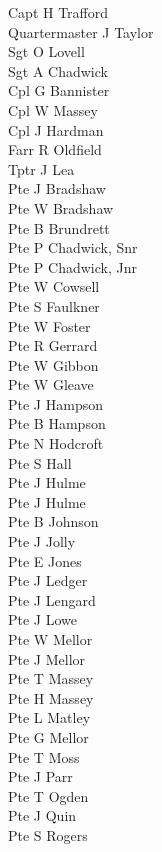 \begin{multicols}{2}
  \noindent
  Capt H Trafford \\
  Quartermaster J Taylor \\
  Sgt O Lovell \\
  Sgt A Chadwick \\
  Cpl G Bannister \\
  Cpl W Massey \\
  Cpl J Hardman \\
  Farr R Oldfield \\
  Tptr J Lea \\
  Pte J Bradshaw \\
  Pte W Bradshaw \\
  Pte B Brundrett \\
  Pte P Chadwick, Snr \\
  Pte P Chadwick, Jnr \\
  Pte W Cowsell \\
  Pte S Faulkner \\
  Pte W Foster \\
  Pte R Gerrard \\
  Pte W Gibbon \\
  Pte W Gleave \\
  Pte J Hampson \\
  Pte B Hampson \\
  Pte N Hodcroft \\
  Pte S Hall \\
  Pte J Hulme \\
  Pte J Hulme \\
  Pte B Johnson \\
  Pte J Jolly \\
  Pte E Jones \\
  Pte J Ledger \\
  Pte J Lengard \\
  Pte J Lowe \\
  Pte W Mellor \\
  Pte J Mellor \\
  Pte T Massey \\
  Pte H Massey \\
  Pte L Matley \\
  Pte G Mellor \\
  Pte T Moss \\
  Pte J Parr \\
  Pte T Ogden \\
  Pte J Quin \\
  Pte S Rogers \\

\end{multicols}

